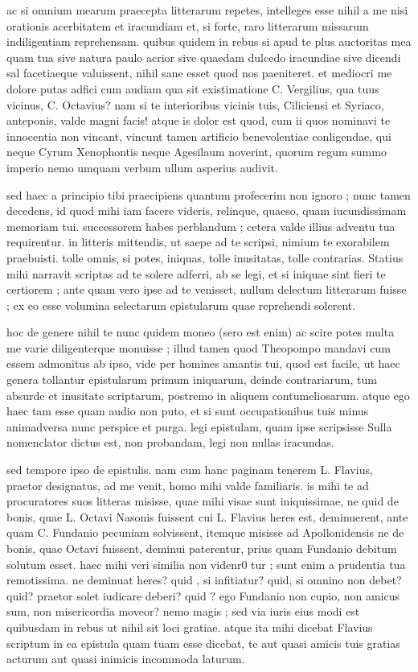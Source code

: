  ac si omnium mearum praecepta litterarum repetes, intelleges esse nihil a me nisi orationis acerbitatem et iracundiam et, si forte, raro litterarum missarum indiligentiam reprehensam. quibus quidem in rebus si apud te plus auctoritas mea quam tua sive natura paulo acrior sive quaedam dulcedo iracundiae sive dicendi sal facetiaeque valuissent, nihil sane esset quod nos paeniteret. et mediocri me dolore putas adfici cum audiam qua sit existimatione C. Vergilius, qua tuus vicinus, C. Octavius? nam si te interioribus vicinis tuis, Ciliciensi et Syriaco, anteponis, valde magni facis! atque is dolor est quod, cum ii quos nominavi te innocentia non vincant, vincunt tamen artificio benevolentiae conligendae, qui neque Cyrum Xenophontis neque Agesilaum noverint, quorum regum summo imperio nemo umquam verbum ullum asperius audivit.

 sed haec a principio tibi praecipiens quantum profecerim non ignoro ; nunc tamen decedens, id quod mihi iam facere videris, relinque, quaeso, quam iucundissimam memoriam tui. successorem habes perblandum ; cetera valde illius adventu tua requirentur. in litteris mittendis, ut saepe ad te scripsi, nimium te exorabilem praebuisti. tolle omnis, si potes, iniquas, tolle inusitatas, tolle contrarias. Statius mihi narravit scriptas ad te solere adferri, ab se legi, et si iniquae sint fieri te certiorem ; ante quam vero ipse ad te venisset, nullum delectum litterarum fuisse ; ex eo esse volumina selectarum epistularum quae reprehendi solerent.

 hoc de genere nihil te nunc quidem moneo (sero est enim) ac scire potes multa me varie diligenterque monuisse ; illud tamen quod Theopompo mandavi cum essem admonitus ab ipso, vide per homines amantis tui, quod est facile, ut haec genera tollantur epistularum primum iniquarum, deinde contrariarum, tum absurde et inusitate scriptarum, postremo in aliquem contumeliosarum. atque ego haec tam esse quam audio non puto, et si sunt occupationibus tuis minus animadversa nunc perspice et purga. legi epistulam, quam ipse scripsisse Sulla nomenclator dictus est, non probandam, legi non nullas iracundas.

 sed tempore ipso de epistulis. nam cum hanc paginam tenerem L. Flavius, praetor designatus, ad me venit, homo mihi valde familiaris. is mihi te ad procuratores suos litteras misisse, quae mihi visae sunt iniquissimae, ne quid de bonis, quae L. Octavi Nasonis fuissent cui L. Flavius heres est, deminuerent, ante quam C. Fundanio pecuniam solvissent, itemque misisse ad Apollonidensis ne de bonis, quae Octavi fuissent, deminui paterentur, prius quam Fundanio debitum solutum esset. haec mihi veri similia non videnr0 tur ; sunt enim a prudentia tua remotissima. ne deminuat heres? quid , si infitiatur? quid, si omnino non debet? quid? praetor solet iudicare deberi? quid ? ego Fundanio non cupio, non amicus sum, non misericordia moveor? nemo magis ; sed via iuris eius modi est quibusdam in rebus ut nihil sit loci gratiae. atque ita mihi dicebat Flavius scriptum in ea epistula quam tuam esse dicebat, te aut quasi amicis tuis gratias acturum aut quasi inimicis incommoda laturum.

